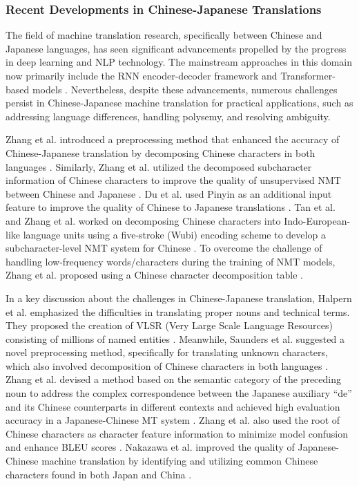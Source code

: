 \documentclass[acmsmall]{acmart}
\begin{document}
\subsubsection{Recent Developments in Chinese-Japanese Translations}

The field of machine translation research, specifically between Chinese and Japanese languages, has seen significant advancements propelled by the progress in deep learning and NLP technology. The mainstream approaches in this domain now primarily include the RNN encoder-decoder framework \cite{1-5} and Transformer-based models \cite{1-7}. Nevertheless, despite these advancements, numerous challenges persist in Chinese-Japanese machine translation for practical applications, such as addressing language differences, handling polysemy, and resolving ambiguity.

Zhang et al. introduced a preprocessing method that enhanced the accuracy of Chinese-Japanese translation by decomposing Chinese characters in both languages \cite{4-2-3}. Similarly, Zhang et al. utilized the decomposed subcharacter information of Chinese characters to improve the quality of unsupervised NMT between Chinese and Japanese \cite{4-2-4}. Du et al. used Pinyin as an additional input feature to improve the quality of Chinese to Japanese translations \cite{4-2-5}. Tan et al. and Zhang et al. worked on decomposing Chinese characters into Indo-European-like language units using a five-stroke (Wubi) encoding scheme to develop a subcharacter-level NMT system for Chinese \cite{4-2-6,n4-37}. To overcome the challenge of handling low-frequency words/characters during the training of NMT models, Zhang et al. proposed using a Chinese character decomposition table \cite{4-2-7-1}.

In a key discussion about the challenges in Chinese-Japanese translation, Halpern et al. emphasized the difficulties in translating proper nouns and technical terms. They proposed the creation of VLSR (Very Large Scale Language Resources) consisting of millions of named entities \cite{4-2-8}. Meanwhile, Saunders et al. suggested a novel preprocessing method, specifically for translating unknown characters, which also involved decomposition of Chinese characters in both languages \cite{4-2-9}. Zhang et al. devised a method based on the semantic category of the preceding noun to address the complex correspondence between the Japanese auxiliary ``de'' and its Chinese counterparts in different contexts and achieved high evaluation accuracy in a Japanese-Chinese MT system \cite{4-2-9-1}. Zhang et al. also used the root of Chinese characters as character feature information to minimize model confusion and enhance BLEU scores \cite{4-2-9-2}. Nakazawa et al. improved the quality of Japanese-Chinese machine translation by identifying and utilizing common Chinese characters found in both Japan and China \cite{4-2-10}.
\end{document}
